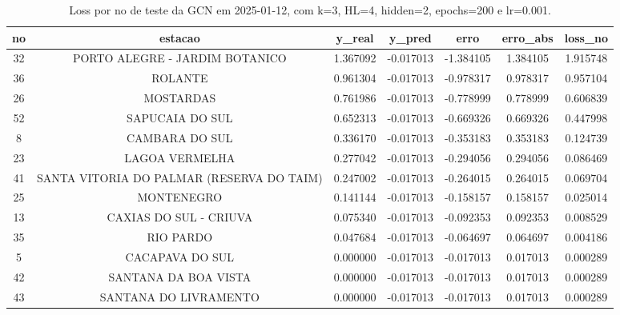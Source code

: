 \begin{table}[h]
\centering
\caption{Loss por no de teste da GCN em 2025-01-12, com k=3, HL=4, hidden=2, epochs=200 e lr=0.001.}
\label{tab:gcn_loss_k3_hl4_h2_e200_d20250112}
\begin{tabular}{ccccccc}
\toprule
no & estacao & y\_real & y\_pred & erro & erro\_abs & loss\_no \\
\midrule
32 & PORTO ALEGRE - JARDIM BOTANICO & 1.367092 & -0.017013 & -1.384105 & 1.384105 & 1.915748 \\
36 & ROLANTE & 0.961304 & -0.017013 & -0.978317 & 0.978317 & 0.957104 \\
26 & MOSTARDAS & 0.761986 & -0.017013 & -0.778999 & 0.778999 & 0.606839 \\
52 & SAPUCAIA DO SUL & 0.652313 & -0.017013 & -0.669326 & 0.669326 & 0.447998 \\
8 & CAMBARA DO SUL & 0.336170 & -0.017013 & -0.353183 & 0.353183 & 0.124739 \\
23 & LAGOA VERMELHA & 0.277042 & -0.017013 & -0.294056 & 0.294056 & 0.086469 \\
41 & SANTA VITORIA DO PALMAR (RESERVA DO TAIM) & 0.247002 & -0.017013 & -0.264015 & 0.264015 & 0.069704 \\
25 & MONTENEGRO & 0.141144 & -0.017013 & -0.158157 & 0.158157 & 0.025014 \\
13 & CAXIAS DO SUL - CRIUVA & 0.075340 & -0.017013 & -0.092353 & 0.092353 & 0.008529 \\
35 & RIO PARDO & 0.047684 & -0.017013 & -0.064697 & 0.064697 & 0.004186 \\
5 & CACAPAVA DO SUL & 0.000000 & -0.017013 & -0.017013 & 0.017013 & 0.000289 \\
42 & SANTANA DA BOA VISTA & 0.000000 & -0.017013 & -0.017013 & 0.017013 & 0.000289 \\
43 & SANTANA DO LIVRAMENTO & 0.000000 & -0.017013 & -0.017013 & 0.017013 & 0.000289 \\
\bottomrule
\end{tabular}
\end{table}
